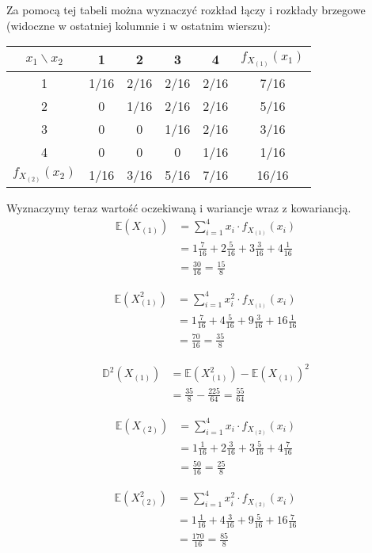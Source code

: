 \documentclass{article}
\begin{document}
Za pomocą tej tabeli można wyznaczyć rozkład łączy i rozkłady brzegowe (widoczne w ostatniej kolumnie i w ostatnim wierszu):

\begin{center}
\begin{tabular}{|c|c|c|c|c|c|}
\hline
$x_1 \backslash x_2$ & 1 & 2 & 3 & 4 & $f_{X_{(1)}}(x_1)$ \\
\hline
1 & 1/16 & 2/16 & 2/16 & 2/16 & 7/16 \\
\hline
2 & 0 & 1/16 & 2/16 & 2/16 & 5/16 \\
\hline
3 & 0 & 0 & 1/16 & 2/16 & 3/16 \\
\hline
4 & 0 & 0 & 0 & 1/16 & 1/16 \\
\hline
$f_{X_{(2)}}(x_2)$ & 1/16 & 3/16 & 5/16 & 7/16 & 16/16 \\
\hline
\end{tabular}
\end{center}

Wyznaczymy teraz wartość oczekiwaną i wariancje wraz z kowariancją.
\begin{align*}
\mathbb{E}(X_{(1)}) & = \sum_{i=1}^{4} x_i\cdot f_{X_{(1)}}(x_i) \\
& = 1\frac{7}{16} + 2\frac{5}{16} + 3\frac{3}{16} + 4\frac{1}{16}\\
& = \frac{30}{16} = \frac{15}{8}
\end{align*}

\begin{align*}
\mathbb{E}(X_{(1)}^2) & = \sum_{i=1}^{4} x_i^2\cdot f_{X_{(1)}}(x_i) \\
& = 1\frac{7}{16} + 4\frac{5}{16} + 9\frac{3}{16} + 16\frac{1}{16}\\
& = \frac{70}{16} = \frac{35}{8}
\end{align*}

\begin{align*}
\mathbb{D}^2(X_{(1)}) & = \mathbb{E}(X_{(1)}^2) - \mathbb{E}(X_{(1)})^2 \\
& = \frac{35}{8} - \frac{225}{64} = \frac{55}{64}
\end{align*}

\begin{align*}
\mathbb{E}(X_{(2)}) & = \sum_{i=1}^{4} x_i\cdot f_{X_{(2)}}(x_i) \\
& = 1\frac{1}{16} + 2\frac{3}{16} + 3\frac{5}{16} + 4\frac{7}{16}\\
& = \frac{50}{16} = \frac{25}{8}
\end{align*}

\begin{align*}
\mathbb{E}(X_{(2)}^2) & = \sum_{i=1}^{4} x_i^2\cdot f_{X_{(2)}}(x_i) \\
& = 1\frac{1}{16} + 4\frac{3}{16} + 9\frac{5}{16} + 16\frac{7}{16}\\
& = \frac{170}{16} = \frac{85}{8}
\end{align*}
\end{document}
